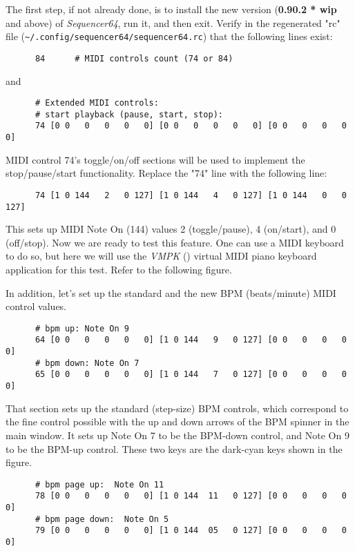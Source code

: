    The first step, if not already done, is to install the new version
   (\textbf{0.90.2 * wip} and above) of \textsl{Sequencer64},
   run it, and then exit.
   Verify in the regenerated "rc" file
   (\texttt{\textasciitilde/.config/sequencer64/sequencer64.rc}) that the
   following lines exist:

   \begin{verbatim}
      84      # MIDI controls count (74 or 84)
   \end{verbatim}

   and

   \begin{verbatim}
      # Extended MIDI controls:
      # start playback (pause, start, stop):
      74 [0 0   0   0   0   0] [0 0   0   0   0   0] [0 0   0   0   0   0]
   \end{verbatim}

   MIDI control 74's toggle/on/off sections will be used to implement the
   stop/pause/start functionality.  Replace the "74" line with the following
   line:

   \begin{verbatim}
      74 [1 0 144   2   0 127] [1 0 144   4   0 127] [1 0 144   0   0 127]
   \end{verbatim}

   This sets up MIDI Note On (144) values 2 (toggle/pause), 4 (on/start), and 0
   (off/stop).
   Now we are ready to test this feature.  One can use a MIDI keyboard to do
   so, but here we will use the \textsl{VMPK} (\cite{vmpk}) virtual MIDI
   piano keyboard application for this test.  Refer to the following figure.

   In addition, let's set up the standard and the new BPM (beats/minute) MIDI
   control values.  

   \begin{verbatim}
      # bpm up: Note On 9
      64 [0 0   0   0   0   0] [1 0 144   9   0 127] [0 0   0   0   0   0]
      # bpm down: Note On 7
      65 [0 0   0   0   0   0] [1 0 144   7   0 127] [0 0   0   0   0   0]
   \end{verbatim}

   That section sets up the standard (step-size) BPM controls, which correspond
   to the fine control possible with the up and down arrows of the BPM spinner
   in the main window.  It sets up Note On 7 to be the BPM-down control, and
   Note On 9 to be the BPM-up control.  These two keys are the dark-cyan keys
   shown in the figure.

   \begin{verbatim}
      # bpm page up:  Note On 11
      78 [0 0   0   0   0   0] [1 0 144  11   0 127] [0 0   0   0   0   0]
      # bpm page down:  Note On 5
      79 [0 0   0   0   0   0] [1 0 144  05   0 127] [0 0   0   0   0   0]
   \end{verbatim}

